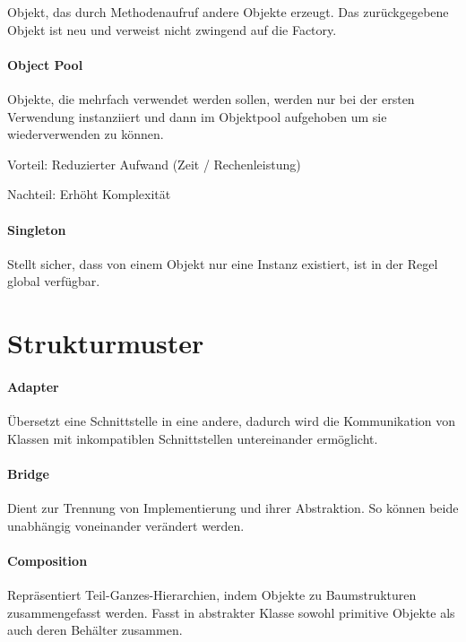Objekt, das durch Methodenaufruf andere Objekte erzeugt. Das zurückgegebene
Objekt ist neu und verweist nicht zwingend auf die Factory.

\paragraph{Object Pool}\label{object-pool}

Objekte, die mehrfach verwendet werden sollen, werden nur bei der ersten
Verwendung instanziiert und dann im Objektpool aufgehoben um sie
wiederverwenden zu können.

Vorteil: Reduzierter Aufwand (Zeit / Rechenleistung)

Nachteil: Erhöht Komplexität

\paragraph{Singleton}\label{singleton}

Stellt sicher, dass von einem Objekt nur eine Instanz existiert, ist in der
Regel global verfügbar.

\section{Strukturmuster}\label{strukturmuster}

\paragraph{Adapter}\label{adapter}

Übersetzt eine Schnittstelle in eine andere, dadurch wird die Kommunikation von
Klassen mit inkompatiblen Schnittstellen untereinander ermöglicht.

\paragraph{Bridge}\label{bridge}

Dient zur Trennung von Implementierung und ihrer Abstraktion. So können beide
unabhängig voneinander verändert werden.

\paragraph{Composition}\label{composition}

Repräsentiert Teil-Ganzes-Hierarchien, indem Objekte zu Baumstrukturen
zusammengefasst werden. Fasst in abstrakter Klasse sowohl primitive Objekte als
auch deren Behälter zusammen.

